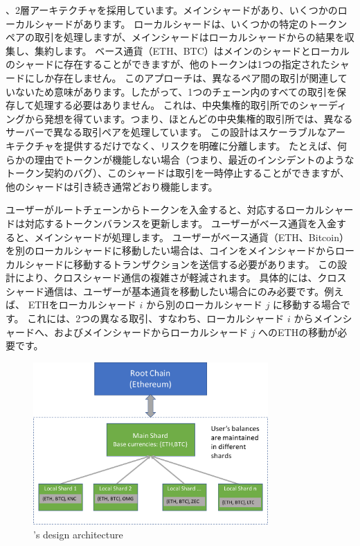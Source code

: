 、2層アーキテクチャを採用しています。メインシャードがあり、いくつかのローカルシャードがあります。 ローカルシャードは、いくつかの特定のトークンペアの取引を処理しますが、メインシャードはローカルシャードからの結果を収集し、集約します。 ベース通貨（ETH、BTC）はメインのシャードとローカルのシャードに存在することができますが、他のトークンは1つの指定されたシャードにしか存在しません。 このアプローチは、異なるペア間の取引が関連していないため意味があります。したがって、1つのチェーン内のすべての取引を保存して処理する必要はありません。 これは、中央集権的取引所でのシャーディングから発想を得ています。つまり、ほとんどの中央集権的取引所では、異なるサーバーで異なる取引ペアを処理しています。 この設計はスケーラブルなアーキテクチャを提供するだけでなく、リスクを明確に分離します。 たとえば、何らかの理由でトークンが機能しない場合（つまり、最近のインシデントのようなトークン契約のバグ）、このシャードは取引を一時停止することができますが、他のシャードは引き続き通常どおり機能します。

ユーザーがルートチェーンからトークンを入金すると、対応するローカルシャードは対応するトークンバランスを更新します。 ユーザーがベース通貨を入金すると、メインシャードが処理します。 ユーザーがベース通貨（ETH、Bitcoin）を別のローカルシャードに移動したい場合は、コインをメインシャードからローカルシャードに移動するトランザクションを送信する必要があります。 この設計により、クロスシャード通信の複雑さが軽減されます。 具体的には、クロスシャード通信は、ユーザーが基本通貨を移動したい場合にのみ必要です。例えば、 ETHをローカルシャード $i$ から別のローカルシャード $j$ に移動する場合です。 これには、2つの異なる取引、すなわち、ローカルシャード $i$ からメインシャードへ、およびメインシャードからローカルシャード $j$ へのETHの移動が必要です。

\begin{figure}[t]
  \centering
  \includegraphics[width=0.8\textwidth]{images//architecture2}
  \caption{\codename's design architecture}
  \label{architecture2}
\end{figure}

